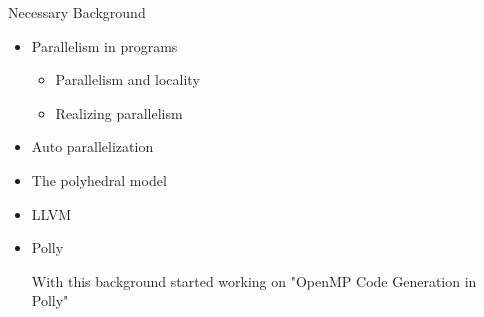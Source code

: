 \documentclass{beamer}
\begin{document}
\begin{frame}{Necessary Background}
\begin{itemize}
\item Parallelism in programs
	\begin{itemize}
	\item Parallelism and locality
	\item Realizing parallelism
	\end{itemize}
\item Auto parallelization
\item The polyhedral model
\item LLVM
\item Polly

With this background started working on "OpenMP Code Generation in Polly"

\end{itemize}
\end{frame}
\end{document}
